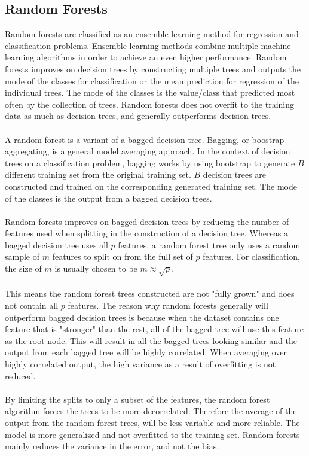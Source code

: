 \documentclass[a4paper,twocolumn]{article}
\begin{document}
\subsection{Random Forests}
Random forests are classified as an ensemble learning method for regression and classification problems. Ensemble learning methods combine multiple machine learning algorithms in order to achieve an even higher performance. Random forests improves on decision trees by constructing multiple trees and outputs the mode of the classes for classification or the mean prediction for regression of the individual trees. The mode of the classes is the value/class that predicted most often by the collection of trees. Random forests does not overfit to the training data as much as decision trees, and generally outperforms decision trees.\\
\\
A random forest is a variant of a bagged decision tree. Bagging, or boostrap aggregating, is a general model averaging approach. In the context of decision trees on a classification problem, bagging works by using bootstrap to generate $B$ different training set from the original training set. $B$ decision trees are constructed and trained on the corresponding generated training set. The mode of the classes is the output from a bagged decision trees.\\
\\
Random forests improves on bagged decision trees by reducing the number of features used when splitting in the construction of a decision tree. Whereas a bagged decision tree uses all $p$ features, a random forest tree only uses a random sample of $m$ features to split on from the full set of $p$ features. For classification, the size of $m$ is usually chosen to be $m \approx \sqrt{p}$.\\
\\
This means the random forest trees constructed are not "fully grown" and does not contain all $p$ features. The reason why random forests generally will outperform bagged decision trees is because when the dataset contains one feature that is "stronger" than the rest, all of the bagged tree will use this feature as the root node. This will result in all the bagged trees looking similar and the output from each bagged tree will be highly correlated. When averaging over highly correlated output, the high variance as a result of overfitting is not reduced.\\
\\
By limiting the splits to only a subset of the features, the random forest algorithm forces the trees to be more decorrelated. Therefore the average of the output from the random forest trees, will be less variable and more reliable. The model is more generalized and not overfitted to the training set. Random forests mainly reduces the variance in the error, and not the bias.
\end{document}
